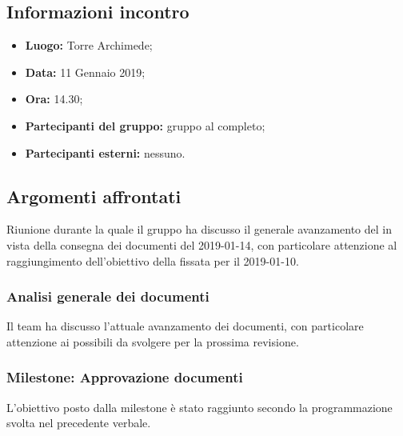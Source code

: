 \subsection{Informazioni incontro}
\begin{itemize}
	\item { \textbf{Luogo:} Torre Archimede;  }
	\item { \textbf{Data:} 11 Gennaio 2019; }
	\item { \textbf{Ora:} 14.30; }
	\item { \textbf{Partecipanti del gruppo:} gruppo al completo;}
	\item { \textbf{Partecipanti esterni:} nessuno. }
\end{itemize}


\subsection{Argomenti affrontati}
Riunione durante la quale il gruppo ha discusso il generale avanzamento del  in vista della consegna dei documenti del 2019-01-14, con particolare attenzione al raggiungimento dell'obiettivo della  fissata per il 2019-01-10.

\subsubsection{Analisi generale dei documenti}
Il team ha discusso l'attuale avanzamento dei documenti, con particolare attenzione ai possibili  da svolgere per la prossima revisione.
\subsubsection{Milestone: Approvazione documenti}
L'obiettivo posto dalla milestone è stato raggiunto secondo la programmazione svolta nel precedente verbale.